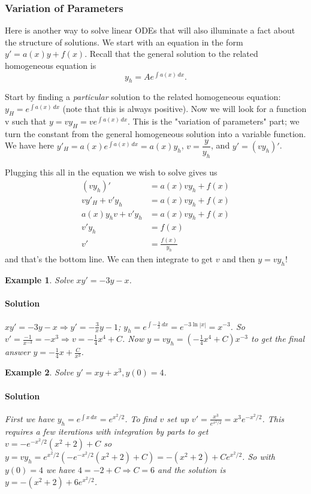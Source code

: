 \documentclass[letterpaper, 11pt, openany]{book}
\theoremstyle{mytheoremstyle}
\theoremstyle{myexamplestyle}
\newtheorem{example}{Example}[section]
\newenvironment{solution}{\paragraph{\sffamily \smaller \fontseries{b}\selectfont Solution}}{\hfill\faSquare}
\begin{document}
\subsubsection{Variation of Parameters}

Here is another way to solve linear ODEs that will also illuminate a fact about the structure of solutions. We start with an equation in the form \(y' = a(x)y + f(x)\). Recall that the general solution to the related homogeneous equation is
\[y_{h} = A e^{\int a(x) \, dx}.\]

Start by finding a \textit{particular} solution to the related homogeneous equation: \(y_H = e^{\int a(x) \, dx}\) (note that this is always positive). Now we will look for a function v such that \(y = v y_H = v e^{\int a(x) \, dx}\). This is the "variation of parameters" part; we turn the constant from the general homogeneous solution into a variable function. We have here \(y'_{H} = a(x) e^{\int a(x) \, dx} = a(x) y_{h}\), \(v=\dfrac{y}{y_{h}}\), and \(y' = (vy_{h})'\).

Plugging this all in the equation we wish to solve gives us
\begin{align*}
    (vy_{h})' &= a(x) v y_{h} + f(x)\\
    vy'_{H} + v' y_{h} &= a(x) v y_{h} + f(x)\\
    a(x)y_{h}v + v' y_{h} &= a(x) v y_{h} + f(x)\\
    v'y_{h} &= f(x)\\
    v' &= \frac{f(x)}{y_{h}}
\end{align*}
and that's the bottom line. We can then integrate to get \(v\) and then \(y = vy_{h}\)! \faSmile

\begin{example}\label{e:de-lin-VoP-gen}
    Solve \(xy' = -3y -x\).
    \begin{solution}
        \(xy' = -3y -x \Rightarrow y' = -\frac{3}{x}y - 1\); \(y_{h} = e^{\int -\frac{3}{x}\, dx} = e^{-3 \ln |x|}=x^{-3}\). So \(v' = \frac{-1}{x^{-3}} = -x^{3} \Rightarrow v = -\frac{1}{4} x^{4} + C\). Now \(y = vy_{h} = \left(-\frac{1}{4} x^{4} + C\right)x^{-3}\) to get the final answer \(y = -\frac{1}{4}x + \frac{C}{x^{3}} \).
    \end{solution}
\end{example}


\begin{example}\label{e:de-lin-VoP-with-IBP}
    Solve \(y' = xy + x^{3}, y(0) = 4\).
    \begin{solution}
        First we have \(y_{h} = e^{\int x \, dx} = e^{x^{2}/2}\). To find \(v\) set up \(v' = \frac{x^{3}}{e^{x^{2}/2}} = x^{3}e^{-x^{2}/2}\). This requires a few iterations with integration by parts to get \(v = -e^{-x^{2}/2} (x^2+2) + C\) so \(y = vy_{h} = e^{x^{2}/2} \left(-e^{-x^{2}/2} (x^2+2) + C\right) = -(x^{2} + 2) + Ce^{x^{2}/2}\). So with \(y(0) = 4\) we have \(4 = -2 + C \Rightarrow C = 6\) and the solution is \(y = -(x^{2} + 2) + 6e^{x^{2}/2}\).
    \end{solution}
\end{example}
\end{document}
